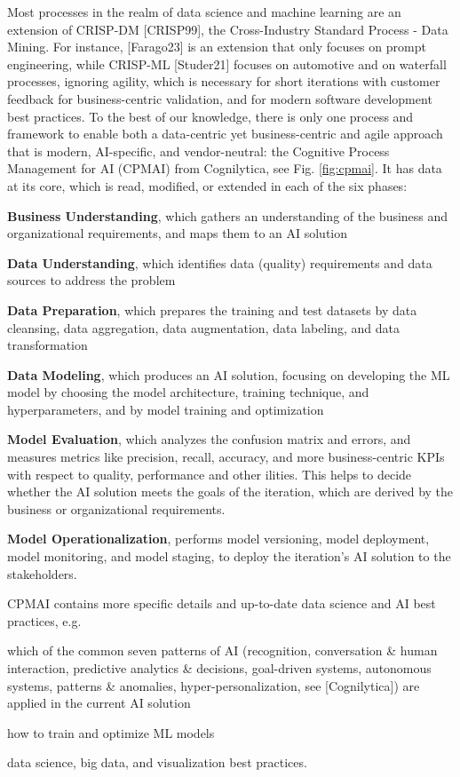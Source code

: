 \documentclass[twocolumn]{article}
\begin{document}
Most processes in the realm of data science and machine learning are an extension of CRISP-DM [CRISP99], the Cross-Industry Standard Process - Data Mining. For instance, [Farago23] is an extension that only focuses on prompt engineering, while CRISP-ML [Studer21] focuses on automotive and on waterfall processes, ignoring agility, which is necessary for short iterations with customer feedback for business-centric validation, and for modern software development best practices. To the best of our knowledge, there is only one process and framework to enable both a data-centric yet business-centric and agile approach that is modern, AI-specific, and vendor-neutral: the Cognitive Process Management for AI (CPMAI) from Cognilytica, see Fig. \ref{fig:cpmai}. It has data at its core, which is read, modified, or extended in each of the six phases:
\begin{compactitem}
\item {\bfseries Business Understanding}, which gathers an understanding of the business and organizational requirements, and maps them to an AI solution
\item {\bfseries Data Understanding}, which identifies data (quality) requirements and data sources to address the problem
\item {\bfseries Data Preparation}, which prepares the training and test datasets by data cleansing, data aggregation, data augmentation, data labeling, and data transformation
\item {\bfseries Data Modeling}, which produces an AI solution, focusing on developing the ML model by choosing the model architecture, training technique, and hyperparameters, and by model training and optimization
\item {\bfseries Model Evaluation}, which analyzes the confusion matrix and errors, and measures metrics like precision, recall, accuracy, and more business-centric KPIs with respect to quality, performance and other ilities. This helps to decide whether the AI solution meets the goals of the iteration, which are derived by the business or organizational requirements. 
\item {\bfseries Model Operationalization}, performs model versioning, model deployment, model monitoring, and model staging, to deploy the iteration’s AI solution to the stakeholders. 
\end{compactitem}

CPMAI contains more specific details and up-to-date data science and AI best practices, e.g.
\begin{compactitem}
\item which of the common seven patterns of AI (recognition, conversation \& human interaction, predictive analytics \& decisions, goal-driven systems, autonomous systems, patterns \& anomalies, hyper-personalization, see [Cognilytica]) are applied in the current AI solution
\item how to train and optimize ML models
\item data science, big data, and visualization best practices.
\end{compactitem}
\end{document}
